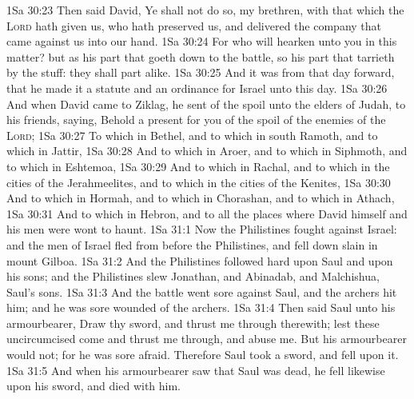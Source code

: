 \vs 1Sa 30:23 Then said David, Ye shall not do so, my brethren, with that which the \textsc{Lord} hath given us, who hath preserved us, and delivered the company that came against us into our hand.
\vs 1Sa 30:24 For who will hearken unto you in this matter? but as his part  that goeth down to the battle, so  his part  that tarrieth by the stuff: they shall part alike.
\vs 1Sa 30:25 And it was  from that day forward, that he made it a statute and an ordinance for Israel unto this day.
\vs 1Sa 30:26 And when David came to Ziklag, he sent of the spoil unto the elders of Judah,  to his friends, saying, Behold a present for you of the spoil of the enemies of the \textsc{Lord};
\vs 1Sa 30:27 To  which  in Bethel, and to  which  in south Ramoth, and to  which  in Jattir,
\vs 1Sa 30:28 And to  which  in Aroer, and to  which  in Siphmoth, and to  which  in Eshtemoa,
\vs 1Sa 30:29 And to  which  in Rachal, and to  which  in the cities of the Jerahmeelites, and to  which  in the cities of the Kenites,
\vs 1Sa 30:30 And to  which  in Hormah, and to  which  in Chorashan, and to  which  in Athach,
\vs 1Sa 30:31 And to  which  in Hebron, and to all the places where David himself and his men were wont to haunt.
\vs 1Sa 31:1 Now the Philistines fought against Israel: and the men of Israel fled from before the Philistines, and fell down slain in mount Gilboa.
\vs 1Sa 31:2 And the Philistines followed hard upon Saul and upon his sons; and the Philistines slew Jonathan, and Abinadab, and Malchishua, Saul's sons.
\vs 1Sa 31:3 And the battle went sore against Saul, and the archers hit him; and he was sore wounded of the archers.
\vs 1Sa 31:4 Then said Saul unto his armourbearer, Draw thy sword, and thrust me through therewith; lest these uncircumcised come and thrust me through, and abuse me. But his armourbearer would not; for he was sore afraid. Therefore Saul took a sword, and fell upon it.
\vs 1Sa 31:5 And when his armourbearer saw that Saul was dead, he fell likewise upon his sword, and died with him.
